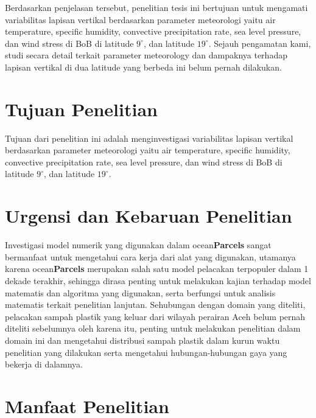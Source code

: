 \begin{spacing}{1.5}
	Berdasarkan penjelasan tersebut, penelitian tesis ini bertujuan untuk mengamati variabilitas lapisan vertikal berdasarkan parameter meteorologi yaitu air temperature, specific humidity, convective precipitation rate, sea level pressure, dan wind stress di BoB di latitude $9^\circ$, dan latitude $19^\circ$. Sejauh pengamatan kami, studi secara detail terkait parameter meteorology dan dampaknya terhadap lapisan vertikal di dua latitude yang berbeda ini belum pernah dilakukan. 
	
%	
%	
	\section[Tujuan Penelitian]{Tujuan Penelitian}
	
	Tujuan dari penelitian ini adalah menginvestigasi variabilitas lapisan vertikal berdasarkan parameter meteorologi yaitu air temperature, specific humidity, convective precipitation rate, sea level pressure, dan wind stress di BoB di latitude $9^\circ$, dan latitude $19^\circ$. 
	
	\section[Urgensi dan Kebaruan Penelitian]{Urgensi dan Kebaruan Penelitian}

	Investigasi model numerik yang digunakan dalam ocean\textbf{Parcels} sangat bermanfaat untuk mengetahui cara kerja dari alat yang digunakan, utamanya karena ocean\textbf{Parcels} merupakan salah satu model pelacakan terpopuler dalam 1 dekade terakhir, sehingga dirasa penting untuk melakukan kajian terhadap model matematis dan algoritma yang digunakan, serta berfungsi untuk analisis matematis terkait penelitian lanjutan. Sehubungan dengan domain yang diteliti, pelacakan sampah plastik yang keluar dari wilayah perairan Aceh belum pernah diteliti sebelumnya oleh karena itu, penting untuk melakukan penelitian dalam domain ini dan mengetahui distribusi sampah plastik dalam kurun waktu penelitian yang dilakukan serta mengetahui hubungan-hubungan gaya yang bekerja di dalamnya.

	\section[Manfaat Penelitian]{Manfaat Penelitian}
	

\end{spacing}
